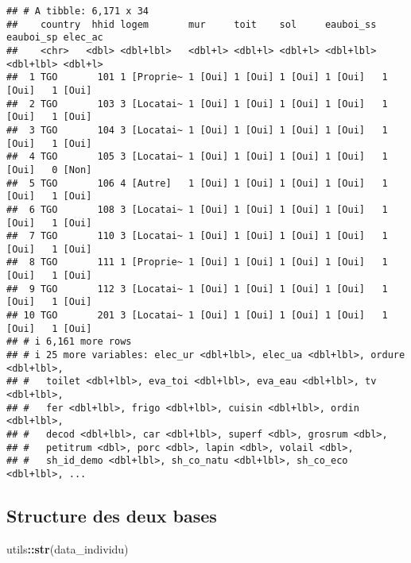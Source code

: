\documentclass[
]{article}
\newenvironment{Shaded}{\begin{snugshade}}{\end{snugshade}}
\newcommand{\FunctionTok}[1]{\textcolor[rgb]{0.13,0.29,0.53}{\textbf{#1}}}
\newcommand{\NormalTok}[1]{#1}
\newcommand{\SpecialCharTok}[1]{\textcolor[rgb]{0.81,0.36,0.00}{\textbf{#1}}}
\begin{document}
\begin{verbatim}
## # A tibble: 6,171 x 34
##    country  hhid logem       mur     toit    sol     eauboi_ss eauboi_sp elec_ac
##    <chr>   <dbl> <dbl+lbl>   <dbl+l> <dbl+l> <dbl+l> <dbl+lbl> <dbl+lbl> <dbl+l>
##  1 TGO       101 1 [Proprie~ 1 [Oui] 1 [Oui] 1 [Oui] 1 [Oui]   1 [Oui]   1 [Oui]
##  2 TGO       103 3 [Locatai~ 1 [Oui] 1 [Oui] 1 [Oui] 1 [Oui]   1 [Oui]   1 [Oui]
##  3 TGO       104 3 [Locatai~ 1 [Oui] 1 [Oui] 1 [Oui] 1 [Oui]   1 [Oui]   1 [Oui]
##  4 TGO       105 3 [Locatai~ 1 [Oui] 1 [Oui] 1 [Oui] 1 [Oui]   1 [Oui]   0 [Non]
##  5 TGO       106 4 [Autre]   1 [Oui] 1 [Oui] 1 [Oui] 1 [Oui]   1 [Oui]   1 [Oui]
##  6 TGO       108 3 [Locatai~ 1 [Oui] 1 [Oui] 1 [Oui] 1 [Oui]   1 [Oui]   1 [Oui]
##  7 TGO       110 3 [Locatai~ 1 [Oui] 1 [Oui] 1 [Oui] 1 [Oui]   1 [Oui]   1 [Oui]
##  8 TGO       111 1 [Proprie~ 1 [Oui] 1 [Oui] 1 [Oui] 1 [Oui]   1 [Oui]   1 [Oui]
##  9 TGO       112 3 [Locatai~ 1 [Oui] 1 [Oui] 1 [Oui] 1 [Oui]   1 [Oui]   1 [Oui]
## 10 TGO       201 3 [Locatai~ 1 [Oui] 1 [Oui] 1 [Oui] 1 [Oui]   1 [Oui]   1 [Oui]
## # i 6,161 more rows
## # i 25 more variables: elec_ur <dbl+lbl>, elec_ua <dbl+lbl>, ordure <dbl+lbl>,
## #   toilet <dbl+lbl>, eva_toi <dbl+lbl>, eva_eau <dbl+lbl>, tv <dbl+lbl>,
## #   fer <dbl+lbl>, frigo <dbl+lbl>, cuisin <dbl+lbl>, ordin <dbl+lbl>,
## #   decod <dbl+lbl>, car <dbl+lbl>, superf <dbl>, grosrum <dbl>,
## #   petitrum <dbl>, porc <dbl>, lapin <dbl>, volail <dbl>,
## #   sh_id_demo <dbl+lbl>, sh_co_natu <dbl+lbl>, sh_co_eco <dbl+lbl>, ...
\end{verbatim}

\subsection{Structure des deux bases}\label{structure-des-deux-bases}

\begin{Shaded}
\begin{Highlighting}[]
\NormalTok{utils}\SpecialCharTok{::}\FunctionTok{str}\NormalTok{(data\_individu)}
\end{Highlighting}
\end{Shaded}
\end{document}
